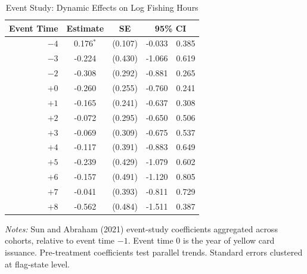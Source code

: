 \begin{table}[t]
\centering
\caption{Event Study: Dynamic Effects on Log Fishing Hours}
\label{tab:eventstudy}
\begin{threeparttable}
\begin{tabular}{rcccc}
\toprule
Event Time & Estimate & SE & \multicolumn{2}{c}{95\% CI} \\
\midrule
$-4$ & 0.176$^{*}$ & (0.107) & -0.033 & 0.385 \\
$-3$ & -0.224 & (0.430) & -1.066 & 0.619 \\
$-2$ & -0.308 & (0.292) & -0.881 & 0.265 \\
$+0$ & -0.260 & (0.255) & -0.760 & 0.241 \\
$+1$ & -0.165 & (0.241) & -0.637 & 0.308 \\
$+2$ & -0.072 & (0.295) & -0.650 & 0.506 \\
$+3$ & -0.069 & (0.309) & -0.675 & 0.537 \\
$+4$ & -0.117 & (0.391) & -0.883 & 0.649 \\
$+5$ & -0.239 & (0.429) & -1.079 & 0.602 \\
$+6$ & -0.157 & (0.491) & -1.120 & 0.805 \\
$+7$ & -0.041 & (0.393) & -0.811 & 0.729 \\
$+8$ & -0.562 & (0.484) & -1.511 & 0.387 \\
\bottomrule
\end{tabular}
\begin{tablenotes}[flushleft]
\small
\item \textit{Notes:} Sun and Abraham (2021) event-study coefficients aggregated across cohorts, relative to event time $-1$. Event time 0 is the year of yellow card issuance. Pre-treatment coefficients test parallel trends. Standard errors clustered at flag-state level.
\end{tablenotes}
\end{threeparttable}
\end{table}
